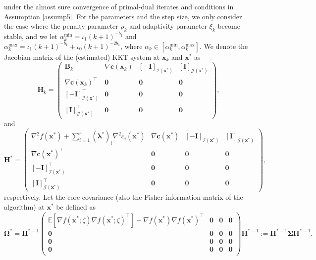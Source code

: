 \documentclass[aos]{imsart}
\numberwithin{equation}{section}
\theoremstyle{plain}
\begin{document}
under the almost sure convergence of primal-dual iterates and conditions in Assumption \ref{assump5}.
For the parameters and the step size, we only consider the case where the penalty parameter $\rho_k$ and adaptivity parameter $\xi_k$ become stable, and we let $\alpha_{k}^{\text{min}} = \iota_1 (k+1)^{-b_1}$ and $\alpha_{k}^{\text{max}} = \iota_1 (k+1)^{-b_1} + \iota_0 (k+1)^{-2b_1}$, where $\alpha_k \in [\alpha_{k}^{\text{min}}, \alpha_{k}^{\text{max}}]$. 
 We denote the Jacobian matrix of the (estimated) KKT system at $\bm{x}_k$ and $\bm{x}^{*}$ as
\begin{equation*}
    \bm{H}_k = \left(\begin{array}{cccc}
           \bm{B}_k & \nabla \bm{c}(\bm{x}_k) & \left[-\bm{I}\right]_{\mathcal{I}(\bm{x}^{*})} & \left[\bm{I}\right]_{\mathcal{J}(\bm{x}^{*})}\\
           \nabla \bm{c}(\bm{x}_k)^{\top} & \bm{0} & \bm{0} & \bm{0}\\
           \left[-\bm{I}\right]_{\mathcal{I}(\bm{x}^{*})}^{\top} & \bm{0} & \bm{0} & \bm{0} \\
           \left[\bm{I}\right]_{\mathcal{J}(\bm{x}^{*})}^{\top} & \bm{0} & \bm{0} & \bm{0}
       \end{array} \right),
\end{equation*}
and 
\begin{equation*}
    \bm{H}^{*} = \left(\begin{array}{cccc}
           \nabla^2 f(\bm{x}^{*}) + \sum_{i=1}^{r} (\bm{\lambda}^{*})_{i} \nabla^2 c_i(\bm{x}^{*}) & \nabla \bm{c}(\bm{x}^{*}) & \left[-\bm{I}\right]_{\mathcal{I}(\bm{x}^{*})} & \left[\bm{I}\right]_{\mathcal{J}(\bm{x}^{*})}\\
           \nabla \bm{c}(\bm{x}^{*})^{\top} & \bm{0} & \bm{0} & \bm{0}\\
           \left[-\bm{I}\right]_{\mathcal{I}(\bm{x}^{*})}^{\top} & \bm{0} & \bm{0} & \bm{0} \\
           \left[\bm{I}\right]_{\mathcal{J}(\bm{x}^{*})}^{\top} & \bm{0} & \bm{0} & \bm{0}
       \end{array} \right),
\end{equation*}
respectively. Let the core covariance (also the Fisher information matrix of the algorithm) at $\bm{x}^{*}$ be defined as
\begin{equation}
\label{def_covariance_matrix}
    \bm{\Omega}^{*} = \bm{H}^{* -1} \left( \begin{array}{cccc}
        \mathbb{E}\left[ \nabla f(\bm{x}^{*};\zeta) \nabla f(\bm{x}^{*};\zeta)^{\top}  \right] - \nabla f(\bm{x}^{*}) \nabla f(\bm{x}^{*})^{\top} & \bm{0} & \bm{0}  & \bm{0}   \\
        \bm{0} & \bm{0} & \bm{0}  & \bm{0}\\
        \bm{0} & \bm{0} & \bm{0}  & \bm{0}\\
        \bm{0} & \bm{0} & \bm{0}  & \bm{0}\\
    \end{array}  \right) \bm{H}^{* -1} := \bm{H}^{* -1} \bm{\Sigma} \bm{H}^{* -1}.
\end{equation}
\end{document}

